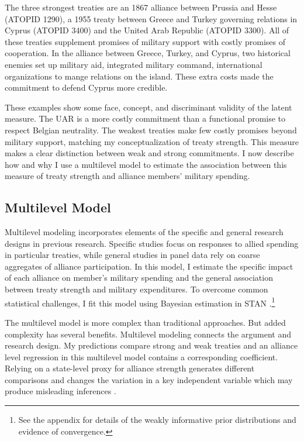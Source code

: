 \documentclass[12pt]{article}
\begin{document}
The three strongest treaties are an 1867 alliance between Prussia and Hesse (ATOPID 1290), a 1955 treaty between Greece and Turkey governing relations in Cyprus (ATOPID 3400) and the United Arab Republic (ATOPID 3300).  
All of these treaties supplement promises of military support with costly promises of cooperation. 
In the alliance between Greece, Turkey, and Cyprus, two historical enemies set up military aid, integrated military command, international organizations to mange relations on the island. 
These extra costs made the commitment to defend Cyprus more credible. 


These examples show some face, concept, and discriminant validity of the latent measure. 
The UAR is a more costly commitment than a functional promise to respect Belgian neutrality. 
The weakest treaties make few costly promises beyond military support, matching my conceptualization of treaty strength. 
This measure makes a clear distinction between weak and strong commitments. 
I now describe how and why I use a multilevel model to estimate the association between this measure of treaty strength and alliance members' military spending.  


\subsection{Multilevel Model} 


Multilevel modeling incorporates elements of the specific and general research designs in previous research. 
Specific studies focus on responses to allied spending in particular treaties, while general studies in panel data rely on coarse aggregates of alliance participation.
In this model, I estimate the specific impact of each alliance on member's military spending and the general association between treaty strength and military expenditures. 
To overcome common statistical challenges, I fit this model using Bayesian estimation in STAN \citep{Carpenteretal2016}.\footnote{See the appendix for details of the weakly informative prior distributions and evidence of convergence.}


The multilevel model is more complex than traditional approaches. 
But added complexity has several benefits. 
Multilevel modeling connects the argument and research design. 
My predictions compare strong and weak treaties and an alliance level regression in this multilevel model contains a corresponding coefficient.
Relying on a state-level proxy for alliance strength generates different comparisons and changes the variation in a key independent variable which may produce misleading inferences \citep{McElreath2016}. 
\end{document}

